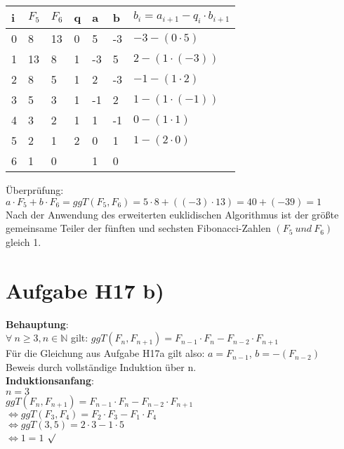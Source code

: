 \documentclass[11pt,a4paper]{article}
\begin{document}
\begin{center}
	\begin{tabular}{ | l | l | l | l | l | l | l|}
		\hline
		i&$F_5$&$F_6$&q&a&b&$b_i=a_{i+1}-q_i \cdot b_{i+1} $ \\ \hline	\hline	
		0&8&13&0&5&-3&$-3-(0 \cdot 5 )$ \\ \hline
		1&13&8&1&-3&5&$2-(1 \cdot (-3) )$ \\ \hline
		2&8&5&1&2&-3&$-1-(1 \cdot 2)$\\ \hline
		3&5&3&1&-1&2&$1-(1 \cdot (-1))$ \\ \hline
		4&3&2&1&1&-1&$0-(1 \cdot 1)$ \\ \hline
		5&2&1&2&0&1&$1-(2\cdot 0)$ \\ \hline
		6&1&0&&1&0&\\ \hline
	\end{tabular}
\end{center}

Überprüfung:\\
$a\cdot F_5 +b \cdot F_6 = ggT(F_5,F_6) = 5 \cdot 8 + ((-3)\cdot 13) = 40+(-39)=1$\\
Nach der Anwendung des erweiterten euklidischen Algorithmus ist der größte gemeinsame Teiler der fünften und sechsten Fibonacci-Zahlen $(F_5~und~F_6)$ gleich 1.\\

\section*{Aufgabe H17 b)}
\textbf{Behauptung}: \\
$\forall~n \geq 3, n \in \mathbb{N}$ gilt: 
$ggT(F_n, F_{n+1}) = F_{n-1} \cdot F_n - F_{n-2} \cdot F_{n+1}$\\
Für die Gleichung aus Aufgabe H17a gilt also: $a = F_{n-1}$, $b = -(F_{n-2})$ \\

Beweis durch vollständige Induktion über n.\\

\textbf{Induktionsanfang}:\\
$n=3$ \\
$ggT(F_n, F_{n+1}) = F_{n-1} \cdot F_n - F_{n-2} \cdot F_{n+1}$ \\
$\Leftrightarrow ggT(F_3, F_{4}) = F_{2} \cdot F_3 - F_{1} \cdot F_{4}$ \\
$\Leftrightarrow ggT(3, 5) = 2 \cdot 3 - 1 \cdot 5$ \\
$\Leftrightarrow 1 = 1$   $\surd$  \\
\end{document}
